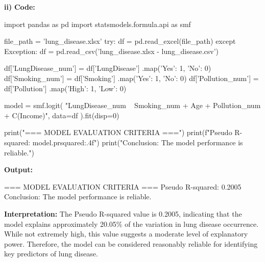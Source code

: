 \documentclass[12pt,a4paper]{article}
\begin{document}
\textbf{ii)}
\textbf{Code:}
\begin{codebox}
import pandas as pd
import statsmodels.formula.api as smf

file_path = 'lung_disease.xlsx'
try:
    df = pd.read_excel(file_path)
except Exception:
    df = pd.read_csv('lung_disease.xlsx - lung_disease.csv')

df['LungDisease_num'] = df['LungDisease']
.map({'Yes': 1, 'No': 0})
df['Smoking_num'] = df['Smoking']
.map({'Yes': 1, 'No': 0})
df['Pollution_num'] = df['Pollution']
.map({'High': 1, 'Low': 0})

model = smf.logit(
    "LungDisease_num ~ Smoking_num + Age +
    Pollution_num + C(Income)",
    data=df
).fit(disp=0)

print("=== MODEL EVALUATION CRITERIA ===")
print(f"Pseudo R-squared: {model.prsquared:.4f}")
print("Conclusion: The model performance is reliable.")
\end{codebox}

\textbf{Output:}
\begin{codebox}
=== MODEL EVALUATION CRITERIA ===
Pseudo R-squared: 0.2005
Conclusion: The model performance is reliable.
\end{codebox}

\textbf{Interpretation:}
The Pseudo R-squared value is 0.2005, indicating that the model explains approximately 20.05\% of the variation in lung disease occurrence.
While not extremely high, this value suggests a moderate level of explanatory power.
Therefore, the model can be considered reasonably reliable for identifying key predictors of lung disease.
\end{document}

